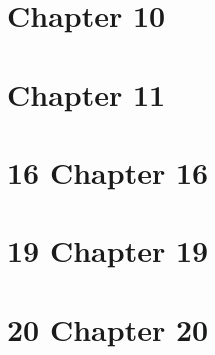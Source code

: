 \documentclass{article}
\theoremstyle{definition}
\begin{document}
\section{Chapter 10}



\section{Chapter 11}




\section*{16 Chapter 16}



\section*{19 Chapter 19}


\section*{20 Chapter 20}



\end{document}
